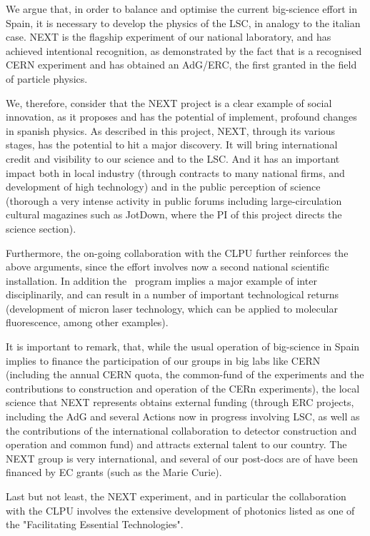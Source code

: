 We argue that, in order to balance and optimise the current big-science effort in Spain, it is necessary to develop the physics of the LSC, in analogy to the italian case. NEXT is the flagship experiment of our national laboratory, and has achieved intentional recognition, as demonstrated by the fact that is a recognised CERN experiment and has obtained an AdG/ERC, the first granted in the field of particle physics. 

We, therefore, consider that the NEXT project is a clear example of social innovation, as it proposes and has the potential of implement, profound changes in spanish physics. As described in this project, NEXT, through its various stages, has the potential to hit a major discovery. It will bring international credit and visibility to our science and to the LSC. And it has an important impact both in local industry (through contracts to many national firms, and development of high technology) and in the public perception of science (thorough a very intense activity in public forums including large-circulation cultural magazines such as JotDown, where the PI of this project directs the science section). 

Furthermore, the on-going collaboration with the CLPU further reinforces the above arguments, since the effort involves now a second national scientific installation. In addition the \BATA\ program implies a major example of inter disciplinarily, and can result in a number of important technological returns (development of micron laser technology, which can be applied to molecular fluorescence, among other examples).

It is important to remark, that, while the usual operation of big-science in Spain implies to finance the participation of our groups in big labs like CERN (including the annual CERN quota, the common-fund of the experiments and the contributions to construction and operation of the CERn experiments), the local science that NEXT represents obtains external funding (through ERC projects, including the AdG and several Actions now in progress involving LSC, as well as the contributions of the international collaboration to detector construction and operation and common fund) and attracts external talent to our country. The NEXT group is very international, and several of our post-docs are of have been financed by EC grants (such as the Marie Curie). 

Last but not least, the NEXT experiment, and in particular the collaboration with the CLPU involves the extensive development of photonics listed as one of the  "Facilitating Essential Technologies".
